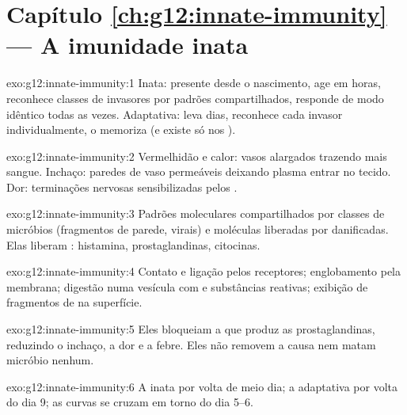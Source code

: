 \section*{Capítulo \ref{ch:g12:innate-immunity} --- A imunidade inata}

\begin{solution}{exo:g12:innate-immunity:1}
Inata: presente desde o nascimento, age em horas, reconhece classes de
invasores por padrões compartilhados, responde de modo idêntico todas
as vezes. Adaptativa: leva dias, reconhece cada invasor individualmente,
o memoriza (e existe só nos ).
\end{solution}

\begin{solution}{exo:g12:innate-immunity:2}
Vermelhidão e calor: vasos alargados trazendo mais sangue. Inchaço:
paredes de vaso permeáveis deixando plasma entrar no tecido. Dor:
terminações nervosas sensibilizadas pelos .
\end{solution}

\begin{solution}{exo:g12:innate-immunity:3}
Padrões moleculares compartilhados por classes de micróbios (fragmentos
de parede,  virais) e moléculas liberadas por 
danificadas. Elas liberam : histamina, prostaglandinas, citocinas.
\end{solution}

\begin{solution}{exo:g12:innate-immunity:4}
Contato e ligação pelos receptores; englobamento pela membrana;
digestão numa vesícula com  e substâncias reativas; exibição de
fragmentos de  na superfície.
\end{solution}

\begin{solution}{exo:g12:innate-immunity:5}
Eles bloqueiam a  que produz as prostaglandinas, reduzindo o
inchaço, a dor e a febre. Eles não removem a causa nem matam micróbio nenhum.
\end{solution}

\begin{solution}{exo:g12:innate-immunity:6}
A inata por volta de meio dia; a adaptativa por volta do dia 9; as
curvas se cruzam em torno do dia 5--6.
\end{solution}

